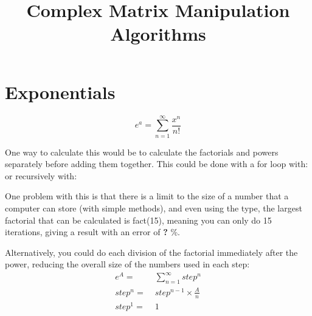 \documentclass{article}
\title{Complex Matrix Manipulation Algorithms}
\date{\vspace{-8ex}}
\newcommand{\summary}{1}
\newcommand{\err}[\summary]{\color{Red}\textbf}
\newcommand{\code}{\color{CadetBlue}}
\newcounter{an}
\newcounter{qu}
\begin{document}
\maketitle
\tableofcontents
\pagebreak

\section{Exponentials}
$$e^a=\sum_{n=1}^{\infty}{\frac{x^n}{n!}}$$

One way to calculate this would be to calculate the factorials and powers separately before adding them together.
This could be done with a for loop with:
{\code{}}
or recursively with:
{\code{}}

One problem with this is that there is a limit to the size of a number that a computer can store (with simple methods), and even using the {\code{long long int}} type, the largest factorial that can be calculated is fact(15), meaning you can only do 15 iterations, giving a result with an error of {\err{?}} \%.

Alternatively, you could do each division of the factorial immediately after the power, reducing the overall size of the numbers used in each step:
\begin{equation}\begin{split}
    e^A = &\; \sum_{n=1}^\infty{step^n}     \\
    step^n = &\; step^{n-1}\times\frac{A}{n}\\
    step^1 = &\; 1                          \\
\end{split}\end{equation}
\end{document}
